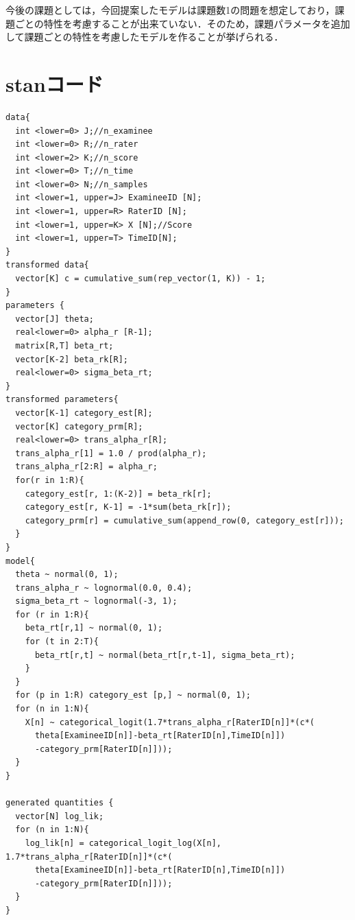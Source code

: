 \documentclass[a4paper,11pt,oneside,openany]{jsbook}
\begin{document}
今後の課題としては，今回提案したモデルは課題数1の問題を想定しており，課題ごとの特性を考慮することが出来ていない．そのため，課題パラメータを追加して課題ごとの特性を考慮したモデルを作ることが挙げられる．

\newpage
\appendix
\chapter{stanコード}
\begin{lstlisting}[basicstyle=\ttfamily\footnotesize, frame=single]
data{
  int <lower=0> J;//n_examinee
  int <lower=0> R;//n_rater
  int <lower=2> K;//n_score
  int <lower=0> T;//n_time
  int <lower=0> N;//n_samples
  int <lower=1, upper=J> ExamineeID [N];
  int <lower=1, upper=R> RaterID [N];
  int <lower=1, upper=K> X [N];//Score
  int <lower=1, upper=T> TimeID[N];
}
transformed data{
  vector[K] c = cumulative_sum(rep_vector(1, K)) - 1;
}
parameters {
  vector[J] theta;
  real<lower=0> alpha_r [R-1];
  matrix[R,T] beta_rt;
  vector[K-2] beta_rk[R];
  real<lower=0> sigma_beta_rt;
}
transformed parameters{
  vector[K-1] category_est[R];
  vector[K] category_prm[R];
  real<lower=0> trans_alpha_r[R];
  trans_alpha_r[1] = 1.0 / prod(alpha_r);
  trans_alpha_r[2:R] = alpha_r;
  for(r in 1:R){
    category_est[r, 1:(K-2)] = beta_rk[r];
    category_est[r, K-1] = -1*sum(beta_rk[r]);
    category_prm[r] = cumulative_sum(append_row(0, category_est[r]));
  }
}
model{
  theta ~ normal(0, 1);
  trans_alpha_r ~ lognormal(0.0, 0.4);
  sigma_beta_rt ~ lognormal(-3, 1);
  for (r in 1:R){
    beta_rt[r,1] ~ normal(0, 1);
    for (t in 2:T){
      beta_rt[r,t] ~ normal(beta_rt[r,t-1], sigma_beta_rt);
    }
  }
  for (p in 1:R) category_est [p,] ~ normal(0, 1);
  for (n in 1:N){
    X[n] ~ categorical_logit(1.7*trans_alpha_r[RaterID[n]]*(c*(
      theta[ExamineeID[n]]-beta_rt[RaterID[n],TimeID[n]])
      -category_prm[RaterID[n]]));
  }
}

generated quantities {
  vector[N] log_lik;
  for (n in 1:N){
    log_lik[n] = categorical_logit_log(X[n], 1.7*trans_alpha_r[RaterID[n]]*(c*(
      theta[ExamineeID[n]]-beta_rt[RaterID[n],TimeID[n]])
      -category_prm[RaterID[n]]));
  }
}

\end{lstlisting}
\newpage



\end{document}
